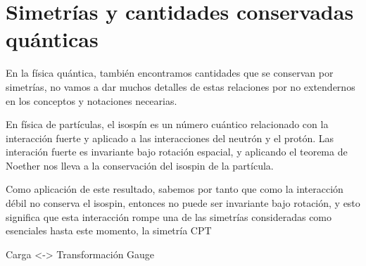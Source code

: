 
\section{Simetrías y cantidades conservadas quánticas}\label{sec:simetrias-y-cantidades-conservadas-quanticas}
En la física quántica, también encontramos cantidades que se conservan por simetrías, no vamos a dar muchos detalles de estas relaciones por no extendernos en los conceptos y notaciones necearias.

En física de partículas, el isospín es un número cuántico relacionado con la interacción fuerte y aplicado a las interacciones del neutrón y el protón.
Las interación fuerte es invariante bajo rotación espacial, y aplicando el teorema de Noether nos lleva a la conservación del isospin de la partícula.

Como aplicación de este resultado, sabemos por tanto que como la interacción débil no conserva el isospin, entonces no puede ser invariante bajo rotación, y esto significa que esta interacción rompe una de las simetrías consideradas como esenciales hasta este momento, la simetría CPT

Carga <-> Transformación Gauge
